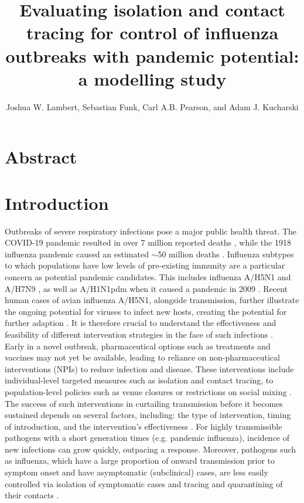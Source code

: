 \documentclass{article}
\title{Evaluating isolation and contact tracing for control of influenza outbreaks with pandemic potential: a modelling study}
\author{Joshua W. Lambert, Sebastian Funk, Carl A.B. Pearson, and Adam J. Kucharski}
\date{}
\begin{document}
\maketitle

\section*{Abstract}

\section*{Introduction}

Outbreaks of severe respiratory infections pose a major public health threat. The COVID-19 pandemic resulted in over 7 million reported deaths \citep{whocovid-19dashboardCOVID19DeathsWHO}, while the 1918 influenza pandemic caused an estimated $\sim$50 million deaths \citep{johnsonUpdatingAccountsGlobal2002}. Influenza subtypes to which populations have low levels of pre-existing immunity are a particular concern as potential pandemic candidates. This includes influenza A/H5N1 \citep{Ward2024.12.11.24318702} and A/H7N9 \citep{tannerPandemicPotentialAvian2015}, as well as A/H1N1pdm when it caused a pandemic in 2009 \citep{fraserPandemicPotentialStrain2009}. Recent human cases of avian influenza A/H5N1, alongside transmission, further illustrate the ongoing potential for viruses to infect new hosts, creating the potential for further adaption \citep{antiaRoleEvolutionEmergence2003, gargHighlyPathogenicAvian2025, peacockGlobalH5N1Influenza2025}. It is therefore crucial to understand the effectiveness and feasibility of different intervention strategies in the face of such infections \citep{fraserFactorsThatMake2004, kucharskiControllingMinorOutbreaks2024}. \\

Early in a novel outbreak, pharmaceutical options such as treatments and vaccines may not yet be available, leading to reliance on non-pharmaceutical interventions (NPIs) to reduce infection and disease. These interventions include individual-level targeted measures such as isolation and contact tracing, to population-level policies such as venue closures or restrictions on social mixing \citep{haugRankingEffectivenessWorldwide2020, sharmaUnderstandingEffectivenessGovernment2021}. The success of such interventions in curtailing transmission before it becomes sustained depends on several factors, including: the type of intervention, timing of introduction, and the intervention's effectiveness \citep{longiniContainingPandemicInfluenza2005}. For highly transmissible pathogens with a short generation times (e.g. pandemic influenza), incidence of new infections can grow quickly, outpacing a response. Moreover, pathogens such as influenza, which have a large proportion of onward transmission prior to symptom onset and have asymptomatic (subclinical) cases, are less easily controlled via isolation of symptomatic cases and tracing and quarantining of their contacts \citep{fraserFactorsThatMake2004}. \\
\end{document}
